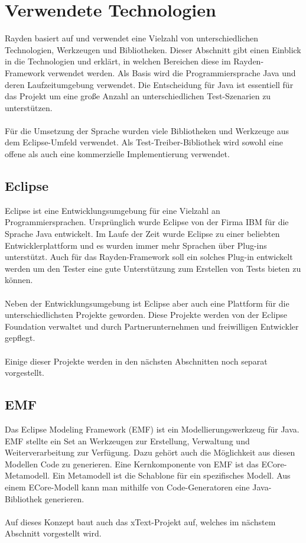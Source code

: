 \section{Verwendete Technologien}

Rayden basiert auf und verwendet eine Vielzahl von unterschiedlichen Technologien, Werkzeugen und Bibliotheken. Dieser Abschnitt gibt einen Einblick in die Technologien und erklärt, in welchen Bereichen diese im Rayden-Framework verwendet werden. Als Basis wird die Programmiersprache Java und deren Laufzeitumgebung verwendet. Die Entscheidung für Java ist essentiell für das Projekt um eine große Anzahl an unterschiedlichen Test-Szenarien zu unterstützen. \\
\\
Für die Umsetzung der Sprache wurden viele Bibliotheken und Werkzeuge aus dem Eclipse-Umfeld verwendet. Als Test-Treiber-Bibliothek wird sowohl eine offene als auch eine kommerzielle Implementierung verwendet.\\

\subsection{Eclipse}

Eclipse ist eine Entwicklungsumgebung für eine Vielzahl an Programmiersprachen. Ursprünglich wurde Eclipse von der Firma IBM für die Sprache Java entwickelt. Im Laufe der Zeit wurde Eclipse zu einer beliebten Entwicklerplattform und es wurden immer mehr Sprachen über Plug-ins unterstützt. Auch für das Rayden-Framework soll ein solches Plug-in entwickelt werden um den Tester eine gute Unterstützung zum Erstellen von Tests bieten zu können. \\
\\
Neben der Entwicklungsumgebung ist Eclipse aber auch eine Plattform für die unterschiedlichsten Projekte geworden. Diese Projekte werden von der Eclipse Foundation verwaltet und durch Partnerunternehmen und freiwilligen Entwickler gepflegt. \\
\\
Einige dieser Projekte werden in den nächsten Abschnitten noch separat vorgestellt.

\subsection{EMF}

Das Eclipse Modeling Framework (EMF) ist ein Modellierungswerkzeug für Java. EMF stellte ein Set an Werkzeugen zur Erstellung, Verwaltung und Weiterverarbeitung zur Verfügung. Dazu gehört auch die Möglichkeit aus diesen Modellen Code zu generieren. Eine Kernkomponente von EMF ist das ECore-Metamodell. Ein Metamodell ist die Schablone für ein spezifisches Modell. Aus einem ECore-Modell kann man mithilfe von Code-Generatoren eine Java-Bibliothek generieren. \\
\\
Auf dieses Konzept baut auch das xText-Projekt auf, welches im nächstem Abschnitt vorgestellt wird. 

